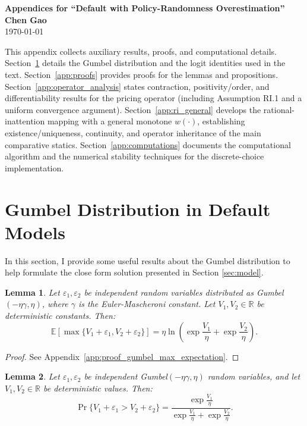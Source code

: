 \documentclass[12pt]{article}
\theoremstyle{plain}
\newtheorem{lemma}{Lemma}
\begin{document}
\begin{center}
	\Large \textbf{Appendices for ``Default with Policy-Randomness Overestimation''}\\
	\vspace{0.5cm}
	\large \textbf{Chen Gao}
	\\
	\large \today
\end{center}

This appendix collects auxiliary results, proofs, and computational details.
Section~\ref{app:gumbel} details the Gumbel distribution and the logit
identities used in the text. Section~\ref{app:proofs} provides proofs for the
lemmas and propositions. Section~\ref{app:operator_analysis} states
contraction, positivity/order, and differentiability results for the pricing
operator (including Assumption RI.1 and a uniform convergence argument).
Section~\ref{app:ri_general} develops the rational-inattention mapping with a
general monotone $w(\cdot)$, establishing existence/uniqueness, continuity, and
operator inheritance of the main comparative statics.
Section~\ref{app:computations} documents the computational algorithm and the
numerical stability techniques for the discrete-choice implementation.

\section{Gumbel Distribution in Default Models}\label{app:gumbel}
In this section, I provide some useful results about the Gumbel distribution to
help formulate the close form solution presented in Section \ref{sec:model}.

\begin{lemma}
	\label{lem:gumbel_max_expectation}
	Let $\varepsilon_1, \varepsilon_2$ be independent random variables distributed as Gumbel$(-\eta\gamma, \eta)$, where $\gamma$ is the Euler-Mascheroni constant. Let $V_1, V_2 \in \mathbb{R}$ be deterministic constants. Then:
	\begin{equation}
		\mathbb{E}\left[\max\{V_1 + \varepsilon_1, V_2 + \varepsilon_2\}\right] = \eta \ln\left( \exp\frac{V_1}{\eta} + \exp\frac{V_2}{\eta} \right).
	\end{equation}
\end{lemma}

\begin{proof}
	See Appendix~\ref{app:proof_gumbel_max_expectation}.
\end{proof}

\begin{lemma}
	\label{lem:gumbel_logit}
	Let $\varepsilon_1, \varepsilon_2$ be independent Gumbel$(-\eta\gamma, \eta)$ random variables, and let $V_1, V_2 \in \mathbb{R}$ be deterministic values. Then:
	\begin{equation}
		\Pr\{V_1 + \varepsilon_1 > V_2 + \varepsilon_2\} = \frac{\exp\frac{V_1}{\eta}}{\exp\frac{V_1}{\eta} + \exp\frac{V_2}{\eta}}.
	\end{equation}
\end{lemma}
\end{document}
